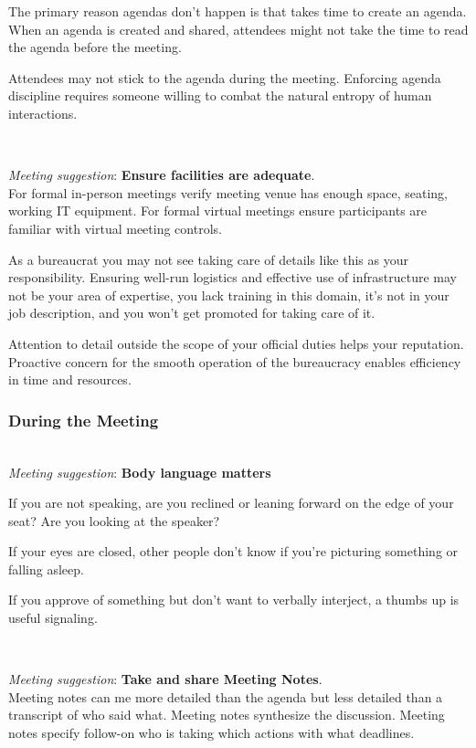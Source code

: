 The primary reason agendas don't happen is that takes time to create an agenda. When an agenda is created and shared, attendees might not take the time to read the agenda before the meeting. 

Attendees may not stick to the agenda during the meeting. Enforcing agenda discipline requires someone willing to combat the natural entropy of human interactions. 



\ \\
\begin{samepage}
\textit{Meeting suggestion}: \textbf{Ensure facilities are adequate}.\\
For formal in-person meetings verify meeting venue has enough space, seating, working IT equipment. For formal virtual meetings ensure participants are familiar with virtual meeting controls. 
\end{samepage}

As a bureaucrat you may not see taking care of details like this as your responsibility. Ensuring well-run logistics and effective use of infrastructure may not be your area of expertise, you lack training in this domain, it's not in your job description, and you won't get promoted for taking care of it. 

Attention to detail outside the scope of your official duties helps your reputation. Proactive concern for the smooth operation of the bureaucracy enables efficiency in time and resources.



\subsubsection*{During the Meeting}

\ \\
\textit{Meeting suggestion}: \textbf{Body language matters}

If you are not speaking, are you reclined or leaning forward on the edge of your seat? Are you looking at the speaker?

If your eyes are closed, other people don't know if you're picturing something or falling asleep. 

If you approve of something but don't want to verbally interject, a thumbs up is useful signaling. 

\ \\
\begin{samepage}
\textit{Meeting suggestion}: \textbf{Take and share Meeting Notes}.\\
Meeting notes can me more detailed than the agenda but less detailed than a transcript of who said what. Meeting notes synthesize the discussion. Meeting notes specify follow-on who is taking which actions with what deadlines. 
\end{samepage}

